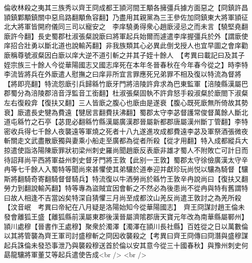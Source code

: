 倫收林殺之夷其三族秀以齊王冏成都王頴河間王顒各擁彊兵據方面惡之【冏鎮許昌頴鎮鄴顒鎮關中惡烏路翻顒魚容翻】乃盡用其親黨為三王參佐加冏鎮東大將軍頴征北大將軍皆開府儀同三司以寵安之　李庠驍勇得衆心趙廞浸忌之而未言【驍堅堯翻廞許今翻】長史蜀郡杜淑張粲說廞曰將軍起兵始爾而遽遣李庠握彊兵於外【謂廞使庠招合壯勇以斷北道也說輸芮翻】非我族類其心必異此倒戈授人也宜早圖之會庠勸廞稱尊號淑粲因白廞以庠大逆不道引斬之并其子姪十餘人　【考異曰載記曰及其子姪宗族三十餘人今從華陽國志又國志庠死在本年冬晉春秋在今年春今從之】時李特李流皆將兵在外廞遣人慰撫之曰庠非所宜言罪應死兄弟罪不相及復以特流為督將【將即亮翻】特流怨廞引兵歸緜竹廞牙門將涪陵許弇求為巴東監軍【涪陵縣漢屬巴郡蜀分為涪陵郡涪音浮監音工銜翻】杜淑張粲固執不許弇怒手殺淑粲於廞閤下淑粲左右復殺弇【復扶又翻】三人皆廞之腹心也廞由是遂衰【腹心既死廞無所倚故其勢衰】廞遣長史犍為費遠【犍居言翻費扶沸翻】蜀郡太守李苾督護常俊督萬餘人斷北道屯緜竹之石亭【苾毘必翻緜竹縣漢屬廣漢郡晉屬新都郡唐屬漢州斷丁管翻】李特密收兵得七千餘人夜襲遠等軍燒之死者十八九遂進攻成都費遠李苾及軍祭酒張微夜斬關走文武盡散廞獨與妻乘小船走至廣都為從者所殺【從才用翻】特入成都縱兵大掠遣使詣洛陽陳廞罪狀初梁州刺史羅尚聞趙廞反表廞非雄才蜀人不附敗亡可計日而待詔拜尚平西將軍益州刺史督牙門將王敦【此别一王敦】蜀郡太守徐儉廣漢太守辛冉等七千餘人入蜀特等聞尚來甚懼使其弟驤於道奉迎并獻珍玩尚悦以驤為騎督【驤斯將翻騎奇寄翻騎督督騎兵】特流復以牛酒勞尚於緜竹王敦辛冉說尚曰【復扶又翻勞力到翻說輸芮翻】特等專為盜賊宜因會斬之不然必為後患尚不從冉與特有舊謂特曰故人相逢不吉當凶矣特深自猜懼三月尚至成都汶山羌反尚遣王敦討之為羌所殺【汶音岷　考異曰帝紀在八月疑是洛陽始知今從華陽國志】　齊王冏謀討趙王倫未發會離狐王盛【離狐縣前漢屬東郡後漢晉屬濟隂郡唐天寶元年改為南華縣屬鄆州】頴川處穆【晉書作王處穆】聚衆於濁澤【濁澤在頴川長社縣】百姓從之日以萬數倫以其將管襲為齊王軍司討盛穆斬之冏因收襲殺之【考異曰齊王冏傳曰冏潛與盛穆謀起兵誅倫未發恐事泄乃與襲殺穆送首於倫以安其意今從三十國春秋】與豫州刺史何勗龍驤將軍董艾等起兵遣使告成<br />
<br />
